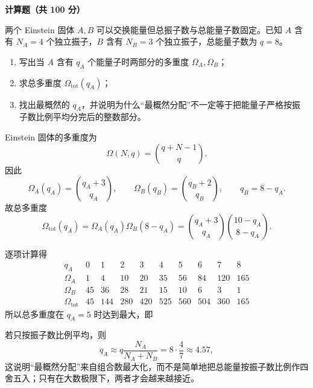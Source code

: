 ﻿


\textbf{计算题（共 100 分）}

\begin{question}[14分]
两个 Einstein 固体 $A,B$ 可以交换能量但总振子数与总能量子数固定。已知 $A$ 含有 $N_A=4$ 个独立振子，$B$ 含有 $N_B=3$ 个独立振子，总能量子数为 $q=8$。
\begin{enumerate}[label=(\arabic*),leftmargin=2.8em,itemsep=0.2em]
\item 写出当 $A$ 含有 $q_A$ 个能量子时两部分的多重度 $\Omega_A,\Omega_B$；
\item 求总多重度 $\Omega_{\mathrm{tot}}(q_A)$；
\item 找出最概然的 $q_A$，并说明为什么“最概然分配”不一定等于把能量子严格按振子数比例平均分完后的整数部分。
\end{enumerate}
\begin{solution}

Einstein 固体的多重度为
\[
\Omega(N,q)=\binom{q+N-1}{q}.
\]
因此
\[
\Omega_A(q_A)=\binom{q_A+3}{q_A},\qquad
\Omega_B(q_B)=\binom{q_B+2}{q_B},
\qquad q_B=8-q_A.
\]
故总多重度
\[
\Omega_{\mathrm{tot}}(q_A)=\Omega_A(q_A)\Omega_B(8-q_A)
=\binom{q_A+3}{q_A}\binom{10-q_A}{8-q_A}.
\]

逐项计算得
\[
\begin{array}{c|ccccccccc}
q_A & 0&1&2&3&4&5&6&7&8\\ \hline
\Omega_A & 1&4&10&20&35&56&84&120&165\\
\Omega_B & 45&36&28&21&15&10&6&3&1\\
\Omega_{\mathrm{tot}} & 45&144&280&420&525&560&504&360&165
\end{array}
\]
所以总多重度在 $q_A=5$ 时达到最大，即

若只按振子数比例平均，则
\[
q_A\approx q\frac{N_A}{N_A+N_B}=8\cdot\frac{4}{7}\approx4.57,
\]
这说明“最概然分配”来自组合数最大化，而不是简单地把总能量按振子数比例作四舍五入；只有在大数极限下，两者才会越来越接近。
\end{solution}
\end{question}


